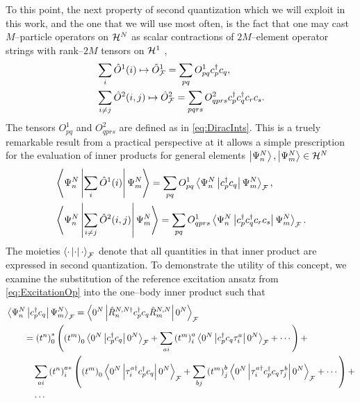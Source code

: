 To this point, the next property of second quantization which we will exploit in this work,
and the one that we will use most often, is the fact that one may
cast $M$--particle operators on $\mathcal{H}^N$ as scalar contractions of $2M$--element operator 
strings with rank--$2M$ tensors on $\mathcal{H}^1$ \cite{Walecka12_book,Schuck04_book,Ostlund12_book},
\begin{subequations}
\label{eq:SeQuantOp}
\begin{align}
  &\sum_i \hat{O}^1(i) \mapsto \hat{O}_{\mathcal{F}}^1 = \sum_{pq}   O^1_{pq} c^\dagger_p c_q,\\
  &\sum_{i\neq j}\hat{O}^2(i,j) \mapsto \hat{O}_{\mathcal{F}}^2 = \sum_{pqrs} O^2_{qprs} c^\dagger _p c^\dagger _q c_r c_s.
\end{align}
\end{subequations}
The tensors $O^1_{pq}$ and $O^2_{qprs}$ are defined as in \cref{eq:DiracInts}. This is a truely remarkable
result from a practical perspective at it allows a simple prescription  for the evaluation of 
inner products for general elements $\left\vert \Psi_n^N \right\rangle, \left\vert \Psi_m^N \right\rangle \in \mathcal{H}^N$
\begin{subequations}
\label{eq:SeQuantInner}
\begin{align}
&\left\langle \Psi_n^N \left\vert \sum_i \hat{O}^1(i) \right\vert \Psi_m^N \right\rangle = \sum_{pq} O^1_{pq} \left\langle \Psi_n^N \left\vert c_p^\dagger c_q \right\vert \Psi_m^N \right\rangle_{\mathcal{F}}, \\
&\left\langle \Psi_n^N \left\vert \sum_{i\neq j} \hat{O}^2(i,j) \right\vert \Psi_m^N \right\rangle = \sum_{pq} O^1_{qprs} \left\langle \Psi_n^N \left\vert c_p^\dagger c_q^\dagger c_r c_s \right\vert \Psi_m^N \right\rangle_{\mathcal{F}}.
\end{align}
\end{subequations}
The moieties $\left\langle \cdot \left\vert \cdot \right\vert \cdot \right\rangle_{\mathcal{F}}$ denote that all quantities in that inner product are expressed in second quantization.
To demonstrate the utility of this concept, we examine the substitution of the reference excitation ansatz from \cref{eq:ExcitationOp}
into the one--body inner product such that
\begin{align}
\label{eq:SeQuantInnerExp}
&\left\langle \Psi_n^N \left\vert c_p^\dagger c_q \right\vert \Psi_m^N \right\rangle_{\mathcal{F}} = \left\langle 0^N \left\vert \hat{R}^{N,N\dagger}_n c_p^\dagger c_q \hat{R}^{N,N}_m \right\vert 0^N \right\rangle_{\mathcal{F}} \nonumber \\
&\qquad= \left( t^n \right)^*_0 \left(
     \left( t^m \right)_0 \left\langle 0^N \left\vert c_p^\dagger c_q \right\vert 0^N \right\rangle_{\mathcal{F}} +
     \sum_{ai} \left( t^m \right)^{a}_i \left\langle 0^N \left\vert c_p^\dagger c_q \tau^{a}_i \right\vert 0^N \right\rangle_{\mathcal{F}} + \cdots
   \right) + \nonumber \\
&\qquad \quad \sum_{ai}\left( t^n \right)^{a*}_i \left(
         \left( t^m \right)_0 \left\langle 0^N \left\vert \tau_i^{a\dagger} c_p^\dagger c_q \right\vert 0^N \right\rangle_{\mathcal{F}} +
         \sum_{bj} \left( t^m \right)^{b}_j \left\langle 0^N \left\vert \tau_i^{a\dagger} c_p^\dagger c_q \tau^{b}_j \right\vert 0^N \right\rangle_{\mathcal{F}} + \cdots
       \right) + \nonumber\\
&\qquad \quad \cdots
\end{align}
